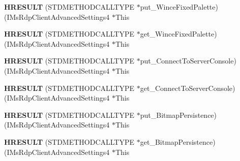 \begin{DoxyCompactItemize}
\item 
\mbox{\label{struct_i_ms_rdp_client_advanced_settings4_vtbl_ad26b5a7915d5750171e317c08ed68587}} 
{\bfseries H\+R\+E\+S\+U\+LT} (S\+T\+D\+M\+E\+T\+H\+O\+D\+C\+A\+L\+L\+T\+Y\+PE $\ast$put\+\_\+\+Wince\+Fixed\+Palette)(I\+Ms\+Rdp\+Client\+Advanced\+Settings4 $\ast$This
\item 
\mbox{\label{struct_i_ms_rdp_client_advanced_settings4_vtbl_a818f23851d80ab36a2fda9d3d24af6fb}} 
{\bfseries H\+R\+E\+S\+U\+LT} (S\+T\+D\+M\+E\+T\+H\+O\+D\+C\+A\+L\+L\+T\+Y\+PE $\ast$get\+\_\+\+Wince\+Fixed\+Palette)(I\+Ms\+Rdp\+Client\+Advanced\+Settings4 $\ast$This
\item 
\mbox{\label{struct_i_ms_rdp_client_advanced_settings4_vtbl_a9392369f69540c52bb2cd31fb18f594a}} 
{\bfseries H\+R\+E\+S\+U\+LT} (S\+T\+D\+M\+E\+T\+H\+O\+D\+C\+A\+L\+L\+T\+Y\+PE $\ast$put\+\_\+\+Connect\+To\+Server\+Console)(I\+Ms\+Rdp\+Client\+Advanced\+Settings4 $\ast$This
\item 
\mbox{\label{struct_i_ms_rdp_client_advanced_settings4_vtbl_a012210ca313380c65e2003edcac952ab}} 
{\bfseries H\+R\+E\+S\+U\+LT} (S\+T\+D\+M\+E\+T\+H\+O\+D\+C\+A\+L\+L\+T\+Y\+PE $\ast$get\+\_\+\+Connect\+To\+Server\+Console)(I\+Ms\+Rdp\+Client\+Advanced\+Settings4 $\ast$This
\item 
\mbox{\label{struct_i_ms_rdp_client_advanced_settings4_vtbl_ae551bbf0d75a48f38f5c7597bd5a4003}} 
{\bfseries H\+R\+E\+S\+U\+LT} (S\+T\+D\+M\+E\+T\+H\+O\+D\+C\+A\+L\+L\+T\+Y\+PE $\ast$put\+\_\+\+Bitmap\+Persistence)(I\+Ms\+Rdp\+Client\+Advanced\+Settings4 $\ast$This
\item 
\mbox{\label{struct_i_ms_rdp_client_advanced_settings4_vtbl_a25a671a4c714e3bd5950927d4312e0c9}} 
{\bfseries H\+R\+E\+S\+U\+LT} (S\+T\+D\+M\+E\+T\+H\+O\+D\+C\+A\+L\+L\+T\+Y\+PE $\ast$get\+\_\+\+Bitmap\+Persistence)(I\+Ms\+Rdp\+Client\+Advanced\+Settings4 $\ast$This
\item 
\mbox{\label{struct_i_ms_rdp_client_advanced_settings4_vtbl_ad7860255034514b65fc28557560e6146}} 

\end{DoxyCompactItemize}

